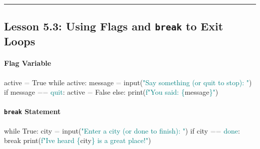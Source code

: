 \documentclass[
  justified,
  openright,
]{tufte-book}
\let\subsubsection\paragraph
\let\paragraph\paragraph
\newcommand{\BuiltInTok}[1]{#1}
\newcommand{\ControlFlowTok}[1]{\textcolor{BrandBlue}{#1}}
\newcommand{\NormalTok}[1]{#1}
\newcommand{\OperatorTok}[1]{\textcolor{DarkGray}{#1}}
\newcommand{\SpecialCharTok}[1]{\textcolor{Teal}{#1}}
\newcommand{\SpecialStringTok}[1]{\textcolor{Teal}{#1}}
\newcommand{\StringTok}[1]{\textcolor{Teal}{#1}}
\newcommand{\VariableTok}[1]{#1}
\newenvironment{Shaded}{%
  \begin{snugshade}
}{%
  \end{snugshade}
}
\let\subsubsection\paragraph
\let\paragraph\paragraph
\begin{document}
\begin{center}\rule{0.5\linewidth}{0.5pt}\end{center}

\subsection{\texorpdfstring{Lesson 5.3: Using Flags and \texttt{break}
to Exit
Loops}{Lesson 5.3: Using Flags and break to Exit Loops}}\label{lesson-5.3-using-flags-and-break-to-exit-loops}

\subsubsection{Flag Variable}\label{flag-variable}

\begin{Shaded}
\begin{Highlighting}[]
\NormalTok{active }\OperatorTok{=} \VariableTok{True}
\ControlFlowTok{while}\NormalTok{ active:}
\NormalTok{    message }\OperatorTok{=} \BuiltInTok{input}\NormalTok{(}\StringTok{"Say something (or \textquotesingle{}quit\textquotesingle{} to stop): "}\NormalTok{)}
    \ControlFlowTok{if}\NormalTok{ message }\OperatorTok{==} \StringTok{\textquotesingle{}quit\textquotesingle{}}\NormalTok{:}
\NormalTok{        active }\OperatorTok{=} \VariableTok{False}
    \ControlFlowTok{else}\NormalTok{:}
        \BuiltInTok{print}\NormalTok{(}\SpecialStringTok{f"You said: }\SpecialCharTok{\{}\NormalTok{message}\SpecialCharTok{\}}\SpecialStringTok{"}\NormalTok{)}
\end{Highlighting}
\end{Shaded}

\subsubsection{\texorpdfstring{\texttt{break}
Statement}{break Statement}}\label{break-statement}

\begin{Shaded}
\begin{Highlighting}[]
\ControlFlowTok{while} \VariableTok{True}\NormalTok{:}
\NormalTok{    city }\OperatorTok{=} \BuiltInTok{input}\NormalTok{(}\StringTok{"Enter a city (or \textquotesingle{}done\textquotesingle{} to finish): "}\NormalTok{)}
    \ControlFlowTok{if}\NormalTok{ city }\OperatorTok{==} \StringTok{\textquotesingle{}done\textquotesingle{}}\NormalTok{:}
        \ControlFlowTok{break}
    \BuiltInTok{print}\NormalTok{(}\SpecialStringTok{f"I\textquotesingle{}ve heard }\SpecialCharTok{\{}\NormalTok{city}\SpecialCharTok{\}}\SpecialStringTok{ is a great place!"}\NormalTok{)}
\end{Highlighting}
\end{Shaded}
\end{document}
